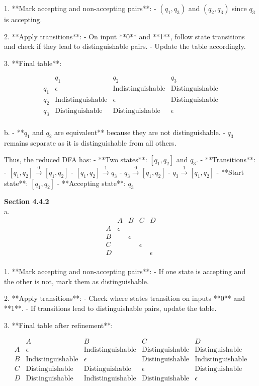 \documentclass{article}
\theoremstyle{theorem}
\theoremstyle{definition}
\theoremstyle{remark}
\begin{document}
1. **Mark accepting and non-accepting pairs**:  
    - \( (q_1, q_3) \) and \( (q_2, q_3) \) since \( q_3 \) is accepting.

2. **Apply transitions**:  
    - On input **0** and **1**, follow state transitions and check if they lead to distinguishable pairs.
    - Update the table accordingly.

3. **Final table**:

\[
\begin{array}{c|ccccc}
    & q_1 & q_2 & q_3 \\
\hline
q_1 & \epsilon & \text{Indistinguishable} & \text{Distinguishable} \\
q_2 & \text{Indistinguishable} & \epsilon & \text{Distinguishable} \\
q_3 & \text{Distinguishable} & \text{Distinguishable} & \epsilon \\
\end{array}
\]

b. 
- **\( q_1 \) and \( q_2 \) are equivalent** because they are not distinguishable.
- \( q_3 \) remains separate as it is distinguishable from all others.

Thus, the reduced DFA has:
- **Two states**: \( [q_1, q_2] \) and \( q_3 \).
- **Transitions**:
  - \( [q_1, q_2] \xrightarrow{0} [q_1, q_2] \)
  - \( [q_1, q_2] \xrightarrow{1} q_3 \)
  - \( q_3 \xrightarrow{0} [q_1, q_2] \)
  - \( q_3 \xrightarrow{1} [q_1, q_2] \)
- **Start state**: \( [q_1, q_2] \)
- **Accepting state**: \( q_3 \)


\textbf{Section 4.4.2} \\
a. 
\[
\begin{array}{c|cccc}
    & A & B & C & D \\
\hline
A & \epsilon &  &  &  \\
B &  & \epsilon &  &  \\
C &  &  & \epsilon &  \\
D &  &  &  & \epsilon \\
\end{array}
\]

1. **Mark accepting and non-accepting pairs**:  
   - If one state is accepting and the other is not, mark them as distinguishable.

2. **Apply transitions**:  
   - Check where states transition on inputs **0** and **1**.
   - If transitions lead to distinguishable pairs, update the table.

3. **Final table after refinement**:

\[
\begin{array}{c|cccc}
    & A & B & C & D \\
\hline
A & \epsilon & \text{Indistinguishable} & \text{Distinguishable} & \text{Distinguishable} \\
B & \text{Indistinguishable} & \epsilon & \text{Distinguishable} & \text{Indistinguishable} \\
C & \text{Distinguishable} & \text{Distinguishable} & \epsilon & \text{Distinguishable} \\
D & \text{Distinguishable} & \text{Indistinguishable} & \text{Distinguishable} & \epsilon \\
\end{array}
\]
\end{document}
